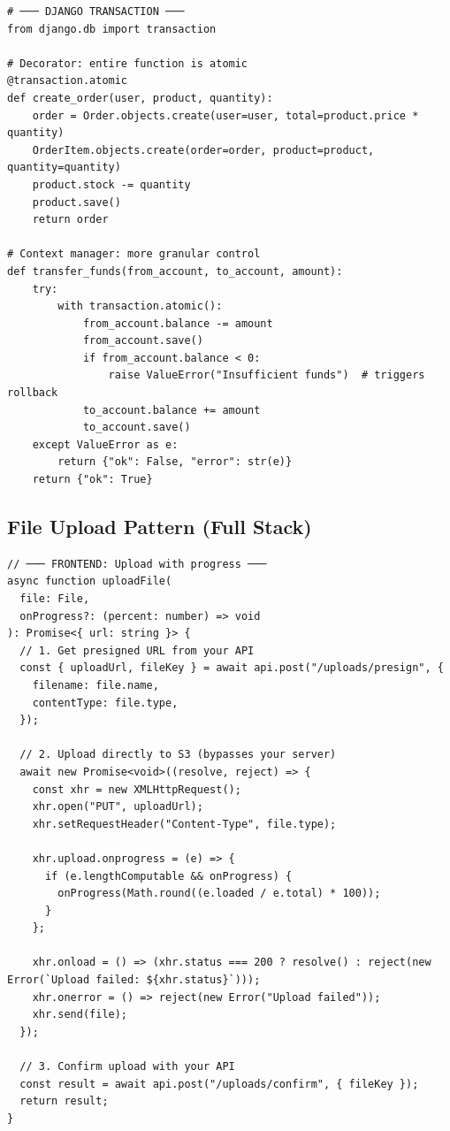 \documentclass[10pt, a4paper]{article}
\begin{document}
\begin{lstlisting}[language=mypython]
# ─── DJANGO TRANSACTION ───
from django.db import transaction

# Decorator: entire function is atomic
@transaction.atomic
def create_order(user, product, quantity):
    order = Order.objects.create(user=user, total=product.price * quantity)
    OrderItem.objects.create(order=order, product=product, quantity=quantity)
    product.stock -= quantity
    product.save()
    return order

# Context manager: more granular control
def transfer_funds(from_account, to_account, amount):
    try:
        with transaction.atomic():
            from_account.balance -= amount
            from_account.save()
            if from_account.balance < 0:
                raise ValueError("Insufficient funds")  # triggers rollback
            to_account.balance += amount
            to_account.save()
    except ValueError as e:
        return {"ok": False, "error": str(e)}
    return {"ok": True}
\end{lstlisting}


\subsection{File Upload Pattern (Full Stack)}


\begin{lstlisting}[language=myjs]
// ─── FRONTEND: Upload with progress ───
async function uploadFile(
  file: File,
  onProgress?: (percent: number) => void
): Promise<{ url: string }> {
  // 1. Get presigned URL from your API
  const { uploadUrl, fileKey } = await api.post("/uploads/presign", {
    filename: file.name,
    contentType: file.type,
  });

  // 2. Upload directly to S3 (bypasses your server)
  await new Promise<void>((resolve, reject) => {
    const xhr = new XMLHttpRequest();
    xhr.open("PUT", uploadUrl);
    xhr.setRequestHeader("Content-Type", file.type);

    xhr.upload.onprogress = (e) => {
      if (e.lengthComputable && onProgress) {
        onProgress(Math.round((e.loaded / e.total) * 100));
      }
    };

    xhr.onload = () => (xhr.status === 200 ? resolve() : reject(new Error(`Upload failed: ${xhr.status}`)));
    xhr.onerror = () => reject(new Error("Upload failed"));
    xhr.send(file);
  });

  // 3. Confirm upload with your API
  const result = await api.post("/uploads/confirm", { fileKey });
  return result;
}
\end{lstlisting}
\end{document}
